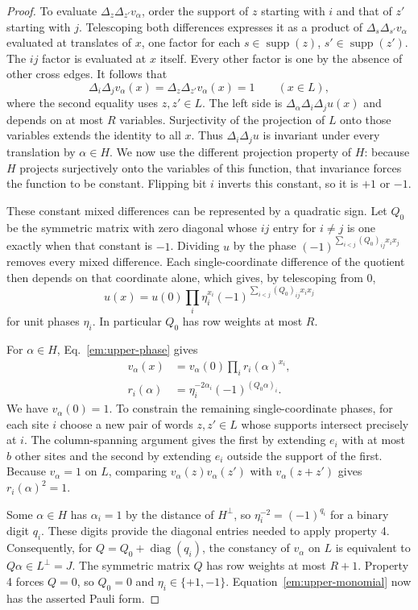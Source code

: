 \documentclass[aps,prl,reprint,notitlepage,nofootinbib,nobibnotes]{revtex4-2}
\begin{document}
\begin{proof}
To evaluate $\Delta_z\Delta_{z'}v_\alpha$, order the support of $z$ starting with $i$ and that of
$z'$ starting with $j$. Telescoping both differences expresses it as a product of
$\Delta_s\Delta_{s'}v_\alpha$ evaluated at translates of $x$, one factor for each
$s\in\operatorname{supp}(z)$, $s'\in\operatorname{supp}(z')$. The $ij$ factor is evaluated at $x$
itself. Every other factor is one by the absence of other cross edges. It follows that
\[
 \Delta_i\Delta_j v_\alpha(x)=\Delta_z\Delta_{z'}v_\alpha(x)=1
 \qquad (x\in L),
\]
where the second equality uses $z,z'\in L$. The left side is $\Delta_\alpha\Delta_i\Delta_j u(x)$
and depends on at most $R$ variables. Surjectivity of the projection of $L$ onto those variables
extends the identity to all $x$. Thus $\Delta_i\Delta_j u$ is invariant under every translation by
$\alpha\in H$. We now use the different projection property of $H$: because $H$ projects
surjectively onto the variables of this function, that invariance forces the function to be
constant. Flipping bit $i$ inverts this constant, so it is $+1$ or $-1$.

These constant mixed differences can be represented by a quadratic sign. Let $Q_0$ be the symmetric
matrix with zero diagonal whose $ij$ entry for $i\ne j$ is one exactly when that constant is $-1$.
Dividing $u$ by the phase $(-1)^{\sum_{i<j}(Q_0)_{ij}x_i x_j}$ removes every mixed difference. Each
single-coordinate difference of the quotient then depends on that coordinate alone, which gives, by
telescoping from $0$,
\begin{equation}\label{em:upper-phase}
 u(x)=u(0)\prod_i\eta_i^{x_i}
          (-1)^{\sum_{i<j}(Q_0)_{ij}x_i x_j}
\end{equation}
for unit phases $\eta_i$. In particular $Q_0$ has row weights at most $R$.

For $\alpha\in H$, Eq.~\eqref{em:upper-phase} gives
\[
 \begin{aligned}
 v_\alpha(x)&=v_\alpha(0)\prod_i r_i(\alpha)^{x_i},\\
 r_i(\alpha)&=\eta_i^{-2\alpha_i}(-1)^{(Q_0\alpha)_i}.
 \end{aligned}
\]
We have $v_\alpha(0)=1$. To constrain the remaining single-coordinate phases, for each site $i$
choose a new pair of words $z,z'\in L$ whose supports intersect precisely at $i$. The
column-spanning argument gives the first by extending $e_i$ with at most $b$ other sites and the
second by extending $e_i$ outside the support of the first. Because $v_\alpha=1$ on $L$, comparing
$v_\alpha(z)v_\alpha(z')$ with $v_\alpha(z+z')$ gives $r_i(\alpha)^2=1$.

Some $\alpha\in H$ has $\alpha_i=1$ by the distance of $H^\perp$, so $\eta_i^{-2}=(-1)^{q_i}$ for a
binary digit $q_i$. These digits provide the diagonal entries needed to apply property 4.
Consequently, for $Q=Q_0+\operatorname{diag}(q_i)$, the constancy of $v_\alpha$ on $L$ is
equivalent to $Q\alpha\in L^\perp=J$. The symmetric matrix $Q$ has row weights at most $R+1$.
Property 4 forces $Q=0$, so $Q_0=0$ and $\eta_i\in\{+1,-1\}$. Equation~\eqref{em:upper-monomial}
now has the asserted Pauli form.
\end{proof}
\end{document}
